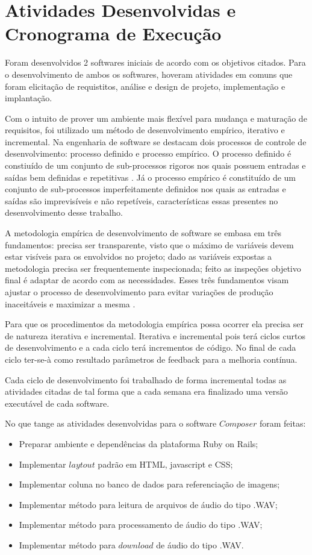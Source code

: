 \chapter{Atividades Desenvolvidas e Cronograma de Execução}

Foram desenvolvidos 2 softwares iniciais de acordo com os objetivos citados. Para o desenvolvimento de ambos os softwares, hoveram atividades em comuns que foram elicitação de requistitos, análise e design de projeto, implementação e implantação.

Com o intuito de prover um ambiente mais flexível para mudança e maturação de requisitos, foi utilizado um método de desenvolvimento empírico, iterativo e incremental. Na engenharia de software se destacam dois processos de controle de desenvolvimento: processo definido e processo empírico. O processo definido é constiuído de um conjunto de sub-processos rigoros nos quais possuem entradas e saídas bem definidas e repetitivas \cite{rup}. Já o processo empírico é constituído de um conjunto de sub-processos imperfeitamente definidos nos quais as entradas e saídas são imprevisíveis e não repetíveis, características essas presentes no desenvolvimento desse trabalho.

A metodologia empírica de desenvolvimento de software se embasa em três fundamentos: precisa ser transparente, visto que o máximo de variáveis devem estar visíveis para os envolvidos no projeto; dado as variáveis expostas a metodologia precisa ser frequentemente inspecionada; feito as inspeções objetivo final é adaptar de acordo com as necessidades. Esses três fundamentos visam ajustar o processo de desenvolvimento para evitar variações de produção inaceitáveis e maximizar a mesma \cite{empirical}.

Para que os procedimentos da metodologia empírica possa ocorrer ela precisa ser de natureza iterativa e incremental. Iterativa e incremental pois terá ciclos curtos de desenvolvimento e a cada ciclo terá incrementos de código. No final de cada ciclo ter-se-à como resultado parâmetros de feedback para a melhoria contínua.

Cada ciclo de desenvolvimento foi trabalhado de forma incremental todas as atividades citadas de tal forma que a cada semana era finalizado uma versão executável de cada software.

No que tange as atividades desenvolvidas para o software $Composer$ foram feitas:
\begin{itemize}
	\item Preparar ambiente e dependências da plataforma Ruby on Rails;
	\item Implementar $laytout$ padrão em HTML, javascript e CSS;
	\item Implementar coluna no banco de dados para referenciação de imagens;
	\item Implementar método para leitura de arquivos de áudio do tipo .WAV;
	\item Implementar método para processamento de áudio do tipo .WAV;
	\item Implementar método para $download$ de áudio do tipo .WAV.
\end{itemize}


